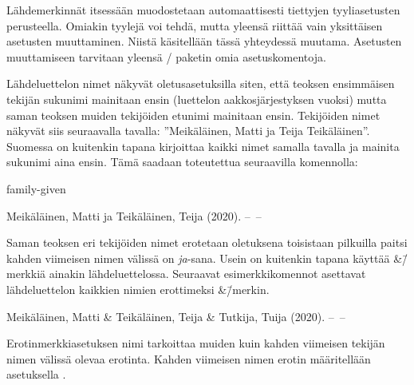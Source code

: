 \begin{koodilohkosis}
\renewcommand{\bibfont}{\sffamily\small}
\end{koodilohkosis}

\noindent
Lähdemerkinnät itsessään muodostetaan automaattisesti tiettyjen
tyyliasetusten perusteella. Omiakin tyylejä voi tehdä, mutta yleensä
riittää vain yksittäisen asetusten muuttaminen. Niistä käsitellään tässä
yhteydessä muutama. Asetusten muuttamiseen tarvitaan yleensä
\-/ paketin omia asetuskomentoja.

Lähdeluettelon nimet näkyvät oletusasetuksilla siten, että teoksen
ensimmäisen tekijän sukunimi mainitaan ensin (luettelon
aakkosjärjestyksen vuoksi) mutta saman teoksen muiden tekijöiden etunimi
mainitaan ensin. Tekijöiden nimet näkyvät siis seuraavalla tavalla:
''Meikäläinen, Matti ja Teija Teikäläinen''. Suomessa on kuitenkin
tapana kirjoittaa kaikki nimet samalla tavalla ja mainita sukunimi aina
ensin. Tämä saadaan toteutettua seuraavilla komennolla:

\begin{koodilohkosis}
 {family-given}
\end{koodilohkosis}

\begin{tulossis}
  Meikäläinen, Matti ja Teikäläinen, Teija (2020). --~--
\end{tulossis}

\noindent
Saman teoksen eri tekijöiden nimet erotetaan oletuksena toisistaan
pilkuilla paitsi kahden viimeisen nimen välissä on \textit{ja}-sana.
Usein on kuitenkin tapana käyttää \&\=/merkkiä ainakin lähdeluettelossa.
Seuraavat esimerkkikomennot asettavat lähdeluettelon kaikkien nimien
erottimeksi \&\=/merkin.

\begin{koodilohkosis}
\end{koodilohkosis}

\begin{tulossis}
  Meikäläinen, Matti \& Teikäläinen, Teija \& Tutkija, Tuija (2020).
  --~--
\end{tulossis}

\noindent
Erotinmerkkiasetuksen nimi  tarkoittaa muiden
kuin kahden viimeisen tekijän nimen välissä olevaa erotinta. Kahden
viimeisen nimen erotin määritellään asetuksella
.

